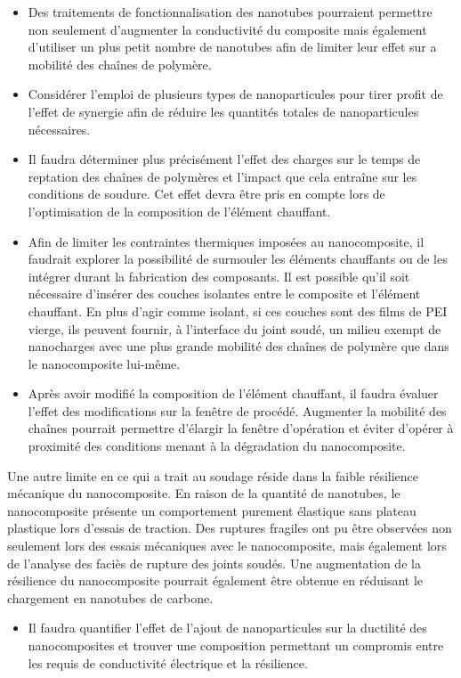 \begin{itemize}
	\item Des traitements de fonctionnalisation des nanotubes pourraient permettre non seulement d'augmenter la conductivité du composite mais également d'utiliser un plus petit nombre de nanotubes afin de limiter leur effet sur a mobilité des chaînes de polymère. 
	\item Considérer l'emploi de plusieurs types de nanoparticules pour tirer profit de l'effet de synergie afin de réduire les quantités totales de nanoparticules nécessaires. 
	\item Il faudra déterminer plus précisément l'effet des charges sur le temps de reptation des chaînes de polymères et l'impact que cela entraîne sur les conditions de soudure. 
	Cet effet devra être pris en compte lors de l'optimisation de la composition de l'élément chauffant. 
	\item Afin de limiter les contraintes thermiques imposées au nanocomposite, il faudrait explorer la possibilité de surmouler les éléments chauffants ou de les intégrer durant la fabrication des composants. 
	Il est possible qu'il soit nécessaire d'insérer des couches isolantes entre le composite et l'élément chauffant. 
	En plus d'agir comme isolant, si ces couches sont des films de PEI vierge, ils peuvent fournir, à l'interface du joint soudé, un milieu exempt de nanocharges avec une plus grande mobilité des chaînes de polymère que dans le nanocomposite lui-même. 
	\item Après avoir modifié la composition de l'élément chauffant, il faudra évaluer l'effet  des modifications sur la fenêtre de procédé. 
	Augmenter la mobilité des chaînes pourrait permettre d'élargir la fenêtre d'opération et éviter d'opérer à proximité des conditions menant à la dégradation du nanocomposite. 
\end{itemize}

Une autre limite en ce qui a trait au soudage réside dans la faible résilience mécanique du nanocomposite. 
En raison de la quantité de nanotubes, le nanocomposite présente un comportement purement élastique sans plateau plastique lors d'essais de traction. 
Des ruptures fragiles ont pu être observées non seulement lors des essais mécaniques avec le nanocomposite, mais également lors de l'analyse des faciès de rupture des joints soudés. 
Une augmentation de la résilience du nanocomposite pourrait également être obtenue en réduisant le chargement en nanotubes de carbone. 

\begin{itemize}
	\item Il faudra quantifier l'effet de l'ajout de nanoparticules sur la ductilité des nanocomposites et trouver une composition permettant un compromis entre les requis de conductivité électrique et la résilience. 
\end{itemize}

